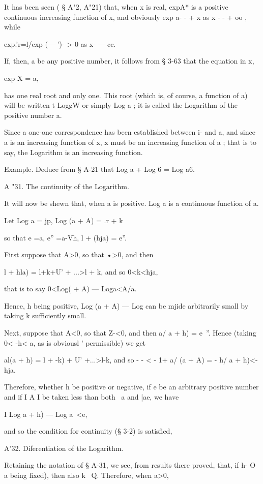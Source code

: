 It has been seen ( § A"2, A"21) that, when x is real, expA* is a positive continuous 
increasing function of x, and obviously exp a- -  + x as x - - + oo , while 

exp.'r=l/exp (—  ')- >-0 as x-  — cc. 

If, then, a be any positive number, it follows from § 3-63 that the equation in x, 

exp X = a, 

has one real root and only one. This root (which is, of course, a function of a) will be 
written t LoggW or simply Log a ; it is called the Logarithm of the positive number a. 

Since a one-one correspondence has been established between i- and a, and since a is 
an increasing function of x, x must be an increasing function of a ; that is to say, the 
Logarithm is an increasing function. 

Example. Deduce from § A-21 that Log a + Log 6 = Log a6. 

A "31. The continuity of the Logarithm. 

It will now be shewn that, when a is positive. Log a is a continuous function of a. 

Let Log a = jp, Log (a + A) = .r + k  

so that e =a, e'' =a-Vh, l + (hja) = e''. 

First suppose that A>0, so that  •>0, and then 

l +  hla) = l+k+U' + ...>l + k, 
and so 0<k<hja, 

that is to say 0<Log(  + A) — Loga<A/a. 

Hence, h being positive, Log (a + A) — Log   can be mjide arbitrarily small by taking k 
sufficiently small. 

Next, suppose that A<0, so that Z-<0, and then a/ a + h) = e~''. 
Hence (taking 0< -h< a, as is obviousl ' permissible) we get 

al(a + h) = l +  -k) + U' +...>l-k, 
and so -  - < - 1+ a/ (a + A) = - h/ a + h)<-  hja. 

Therefore, whether h be positive or negative, if e be an arbitrary positive number and 
if I A I be taken less than both \ a and |ae, we have 

I Log  a + h) — Log a\ <e, 

and so the condition for continuity (§ 3-2) is satisfied, 

A'32. Diferentiation of the Logarithm. 

Retaining the notation of § A-31, we see, from results there proved, that, if h- O 
 a being fixed), then also k ~Q. Therefore, when a>0, 

